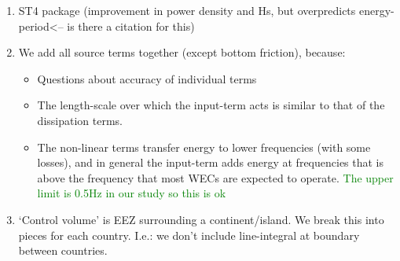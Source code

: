 \begin{enumerate}
\item ST4 package (improvement in power density and Hs, but overpredicts energy-period<-- is there a citation for this)
\item We add all source terms together (except bottom friction), because:
  \begin{itemize}
  \item Questions about accuracy of individual terms \citep{garcia-medinaWaveResourceAssessment2014}
  \item The length-scale over which the input-term acts is similar to that of the dissipation terms.
  \item The non-linear terms transfer energy to lower frequencies (with some losses), and in general the input-term adds energy at frequencies that is above the frequency that most WECs are expected to operate.  \textcolor{green}{The upper limit is 0.5Hz in our study so this is ok}
  \end{itemize}
\item ‘Control volume’ is EEZ surrounding a continent/island. We break this into pieces for each country. I.e.: we don’t include line-integral at boundary between countries.
\end{enumerate}


